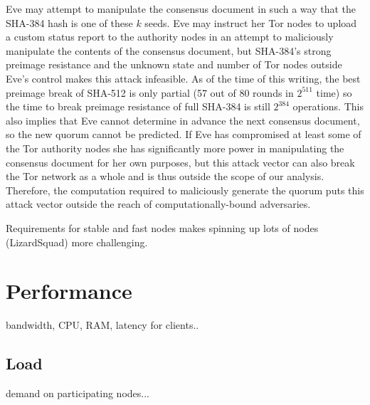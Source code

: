 Eve may attempt to manipulate the consensus document in such a way that the SHA-384 hash is one of these $ k $ seeds. Eve may instruct her Tor nodes to upload a custom status report to the authority nodes in an attempt to maliciously manipulate the contents of the consensus document, but SHA-384's strong preimage resistance and the unknown state and number of Tor nodes outside Eve's control makes this attack infeasible. As of the time of this writing, the best preimage break of SHA-512 is only partial (57 out of 80 rounds in $ 2^{511} $ time\cite{li2012converting}) so the time to break preimage resistance of full SHA-384 is still $ 2^{384} $ operations. This also implies that Eve cannot determine in advance the next consensus document, so the new quorum cannot be predicted. If Eve has compromised at least some of the Tor authority nodes she has significantly more power in manipulating the consensus document for her own purposes, but this attack vector can also break the Tor network as a whole and is thus outside the scope of our analysis. Therefore, the computation required to maliciously generate the quorum puts this attack vector outside the reach of computationally-bound adversaries.

Requirements for stable and fast nodes makes spinning up lots of nodes (LizardSquad) more challenging.

\section{Performance}

bandwidth, CPU, RAM, latency for clients..

\subsection{Load}

demand on participating nodes...

